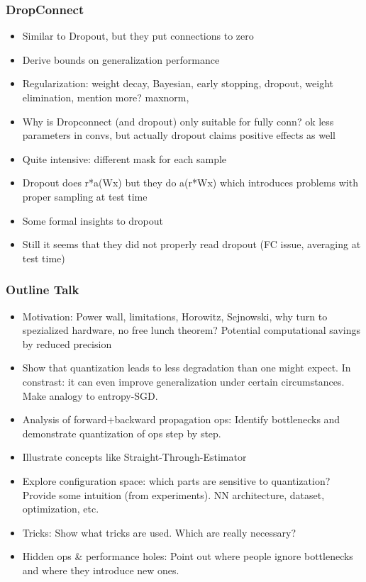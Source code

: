 \documentclass{article}
\begin{document}
\subsubsection*{DropConnect}
\begin{itemize}
    \item Similar to Dropout, but they put connections to zero
    \item Derive bounds on generalization performance
    \item Regularization: weight decay, Bayesian, early stopping, dropout, weight
    elimination, mention more? maxnorm, 
    \item Why is Dropconnect (and dropout) only suitable for fully conn? ok less
    parameters in convs, but actually dropout claims positive effects as well
    \item Quite intensive: different mask for each sample
    \item Dropout does r*a(Wx) but they do a(r*Wx) which introduces problems with
    proper sampling at test time
    \item Some formal insights to dropout
    \item Still it seems that they did not properly read dropout (FC issue, averaging
    at test time)
\end{itemize}

\subsubsection*{Outline Talk}
\begin{itemize}
    \item Motivation: Power wall, limitations, Horowitz, Sejnowski, why turn to
    spezialized hardware, no free lunch theorem? Potential computational savings
    by reduced precision
    \item Show that quantization leads to less degradation than one might expect.
    In constrast: it can even improve generalization under certain circumstances.
    Make analogy to entropy-SGD.
    \item Analysis of forward+backward propagation ops: Identify bottlenecks and
    demonstrate quantization of ops step by step.
    \item Illustrate concepts like Straight-Through-Estimator
    \item Explore configuration space: which parts are sensitive to quantization?
    Provide some intuition (from experiments). NN architecture, dataset, optimization, etc.
    \item Tricks: Show what tricks are used. Which are really necessary?
    \item Hidden ops \& performance holes: Point out where people ignore bottlenecks
    and where they introduce new ones.
\end{itemize}
\end{document}
